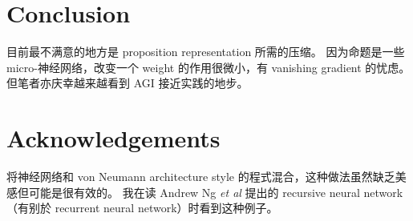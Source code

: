 \documentclass[orivec]{article}
\newcommand{\cc}[2]{#1}
\newcommand{\cc}[2]{#2}
\newcommand*\sigmoid{\vcenter{\hbox{\texttt{[image: ../sigmoid.png]}}}}
\begin{document}
\section{Conclusion}

\cc{
目前最不满意的地方是 proposition representation 所需的压缩。  因为命题是一些 micro-神经网络，改变一个 weight 的作用很微小，有 vanishing gradient 的忧虑。  但笔者亦庆幸越来越看到 AGI 接近实践的地步。}{
One thing we are not satisfied with is the need for compression of the proposition representation.  Representing a proposition as a micro-NN, changing its weights may have very small and indirect effects, thus the vanishing gradient is a worry.  But I am glad to see the goal of AGI getting more and more achievable.
}

\section*{Acknowledgements}

\cc{
将神经网络和 von Neumann architecture style 的程式混合，这种做法虽然缺乏美感但可能是很有效的。 我在读 Andrew Ng \textit{et al} 提出的 recursive neural network（有别於 recurrent neural network）时看到这种例子。 }{
Mixing neural networks with von Neumann-style architecture programming, while biologically inelegant, may be highly effective.  I saw an example of this from Andrew Ng \textit{et al}'s paper on recursive neural networks (not to be confused with recurrent neural networks).
}


\end{document}
